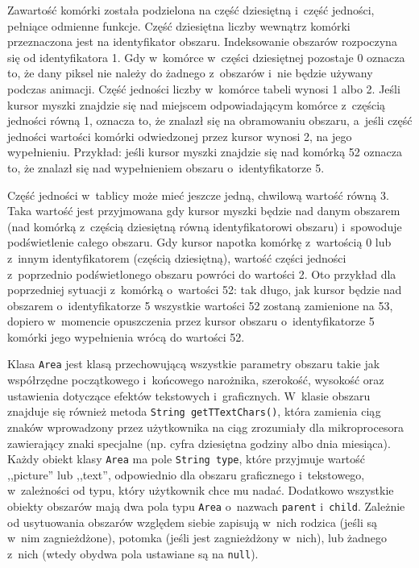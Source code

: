 Zawartość komórki została podzielona na część dziesiętną i~część jedności, pełniące odmienne funkcje. Część dziesiętna liczby wewnątrz komórki przeznaczona jest na identyfikator obszaru. Indeksowanie obszarów rozpoczyna się od identyfikatora 1. Gdy w~komórce w~części dziesiętnej pozostaje 0 oznacza to, że dany piksel nie należy do żadnego z~obszarów i~nie będzie używany podczas animacji. Część jedności liczby w~komórce tabeli wynosi 1 albo 2. Jeśli kursor myszki znajdzie się nad miejscem odpowiadającym komórce z~częścią jedności równą 1, oznacza to, że znalazł się na obramowaniu obszaru, a~jeśli część jedności wartości komórki odwiedzonej przez kursor wynosi 2, na jego wypełnieniu. Przykład: jeśli kursor myszki znajdzie się nad komórką 52 oznacza to, że znalazł się nad wypełnieniem obszaru o~identyfikatorze 5. 

Część jedności w~tablicy może mieć jeszcze jedną, chwilową wartość równą 3. Taka wartość jest przyjmowana gdy kursor myszki będzie nad danym obszarem (nad komórką z~częścią dziesiętną równą identyfikatorowi obszaru) i~spowoduje podświetlenie całego obszaru. Gdy kursor napotka komórkę z~wartością 0 lub z~innym identyfikatorem (częścią dziesiętną), wartość części jedności z~poprzednio podświetlonego obszaru powróci do wartości 2. Oto przykład dla poprzedniej sytuacji z~komórką o~wartości 52: tak długo, jak kursor będzie nad obszarem o~identyfikatorze 5 wszystkie wartości 52 zostaną zamienione na 53, dopiero w~momencie opuszczenia przez kursor obszaru o~identyfikatorze 5 komórki jego wypełnienia wrócą do wartości 52.

Klasa \texttt{Area} jest klasą przechowującą wszystkie parametry obszaru takie jak współrzędne początkowego i~końcowego narożnika, szerokość, wysokość oraz ustawienia dotyczące efektów tekstowych i~graficznych. W~klasie obszaru znajduje się również metoda \texttt{String getTTextChars()}, która zamienia ciąg znaków wprowadzony przez użytkownika na ciąg zrozumiały dla mikroprocesora zawierający znaki specjalne (np. cyfra dziesiętna godziny albo dnia miesiąca). Każdy obiekt klasy \texttt{Area} ma pole \texttt{String type}, które przyjmuje wartość ,,picture'' lub ,,text'', odpowiednio dla obszaru graficznego i~tekstowego, w~zależności od typu, który użytkownik chce mu nadać. Dodatkowo wszystkie obiekty obszarów mają dwa pola typu \texttt{Area} o~nazwach \texttt{parent} i~\texttt{child}. Zależnie od usytuowania obszarów względem siebie zapisują w~nich rodzica (jeśli są w~nim zagnieżdżone), potomka (jeśli jest zagnieżdżony w~nich), lub żadnego z~nich (wtedy obydwa pola ustawiane są na \texttt{null}).

